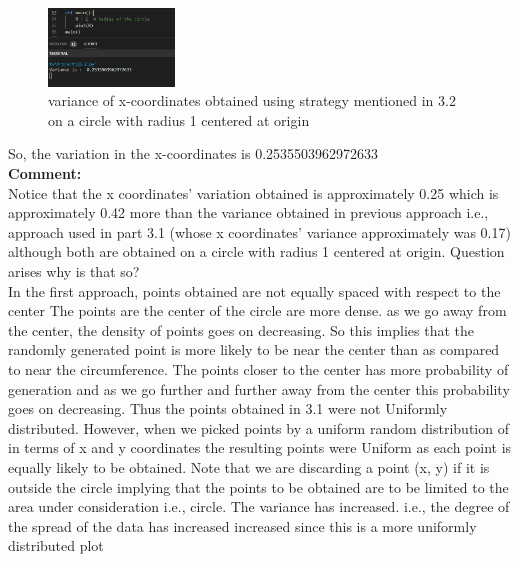 \documentclass[answers]{exam}
\begin{document}
\begin{framed}
    \begin{figure}[H] %
    \centering
    \includegraphics[width= 0.3\textwidth]{Q3.2_variance.PNG}
    \caption{variance of x-coordinates obtained using strategy mentioned in 3.2 on a circle with radius 1 centered at origin}
    \end{figure}
    
    So, the variation in the x-coordinates is 0.2535503962972633 \\

\textbf{Comment:} \\
Notice that the x coordinates' variation obtained is approximately 0.25 which is approximately 0.42 more than the variance obtained in previous approach i.e., approach used in part 3.1 (whose x coordinates' variance approximately was 0.17) although both are obtained on a circle with radius 1 centered at origin. Question arises why is that so? \\
In the first approach, points obtained are not equally spaced with respect to the center The points are the center of the circle are more dense. as we go away from the center, the density of points goes on decreasing. So this implies that the randomly generated point is more likely to be near the center than as compared to near the circumference. The points closer to the center has more probability of generation and as we go further and further away from the center this probability goes on decreasing. Thus the points obtained in 3.1 were not Uniformly distributed. However, when we picked points by a uniform random distribution of in terms of x and y coordinates the resulting points were Uniform as each point is equally likely to be obtained. Note that we are discarding a point (x, y) if it is outside the circle implying that the points to be obtained are to be limited to the area under consideration i.e., circle. The variance has increased. i.e., the degree of the spread of the data has increased increased since this is a more uniformly distributed plot \\
\end{framed}

\end{document}
